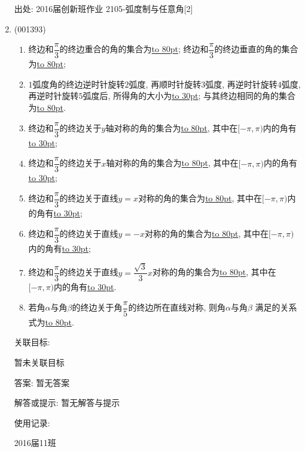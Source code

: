 \documentclass[10pt,a4paper]{article}
\newcommand{\blank}[1]{\underline{\hbox to #1pt{}}}
\begin{document}
\begin{enumerate}[1.]
出处: 2016届创新班作业	2105-弧度制与任意角[2]
\item { (001393)}\begin{enumerate}[(1)]
\item 终边和$\dfrac{\pi}{3}$的终边重合的角的集合为\blank{80}; 终边和$\dfrac{\pi}{3}$的终边垂直的角的集合为\blank{80};\\ 
\item $1$弧度角的终边逆时针旋转$2$弧度, 再顺时针旋转$3$弧度, 再逆时针旋转$4$弧度, 再逆时针旋转$5$弧度后, 所得角的大小为\blank{30}; 与其终边相同的角的集合为\blank{80}.\\ 
\item 终边和$\dfrac{\pi}{3}$的终边关于$y$轴对称的角的集合为\blank{80}, 其中在$[-\pi,\pi)$内的角有\blank{30};\\ 
\item 终边和$\dfrac{\pi}{3}$的终边关于$x$轴对称的角的集合为\blank{80}, 其中在$[-\pi,\pi)$内的角有\blank{30};\\ 
\item 终边和$\dfrac{\pi}{3}$的终边关于直线$y=x$对称的角的集合为\blank{80}, 其中在$[-\pi,\pi)$内的角有\blank{30};\\ 
\item 终边和$\dfrac{\pi}{3}$的终边关于直线$y=-x$对称的角的集合为\blank{80}, 其中在$[-\pi,\pi)$内的角有\blank{30};\\ 
\item 终边和$\dfrac{\pi}{3}$的终边关于直线$y=\dfrac{\sqrt{3}}{3}x$对称的角的集合为\blank{80}, 其中在$[-\pi,\pi)$内的角有\blank{30}.\\ 
\item 若角$\alpha$与角$\beta$的终边关于角$\dfrac{\pi}{5}$的终边所在直线对称, 则角$\alpha$与角$\beta$ 满足的关系式为\blank{80}.\\ 
\end{enumerate}


关联目标:

暂未关联目标

答案: 暂无答案

解答或提示: 暂无解答与提示

使用记录:

2016届11班								


\end{enumerate}
\end{document}

